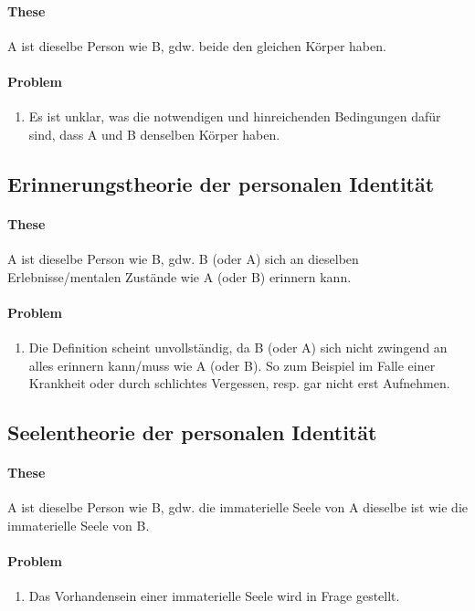 \documentclass[../main.tex]{subfiles}
\begin{document}
\paragraph{These} A ist dieselbe Person wie B, gdw. beide den gleichen Körper haben. 
\paragraph{Problem} 
\begin{enumerate}
	\item Es ist unklar, was die notwendigen und hinreichenden Bedingungen dafür sind, dass A und B denselben Körper haben. 
\end{enumerate}

\subsection{Erinnerungstheorie der personalen Identität}
\paragraph{These} A ist dieselbe Person wie B, gdw. B (oder A) sich an dieselben Erlebnisse/mentalen Zustände wie A (oder B) erinnern kann. 
\paragraph{Problem} 
\begin{enumerate}
	\item Die Definition scheint unvollständig, da B (oder A) sich nicht zwingend an alles erinnern kann/muss wie A (oder B). So zum Beispiel im Falle einer Krankheit oder durch schlichtes Vergessen, resp. gar nicht erst Aufnehmen.
\end{enumerate}

\subsection{Seelentheorie der personalen Identität}
\paragraph{These} A ist dieselbe Person wie B, gdw. die immaterielle Seele von A dieselbe ist wie die immaterielle Seele von B.
\paragraph{Problem} 
\begin{enumerate}
	\item Das Vorhandensein einer immaterielle Seele wird in Frage gestellt. 
\end{enumerate}
\end{document}
